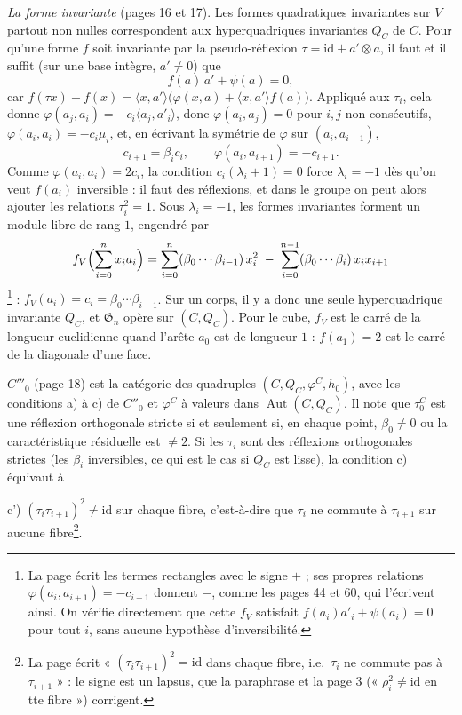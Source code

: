 \documentclass[11pt,a4paper]{article}
\begin{document}
\emph{La forme invariante} (pages 16 et 17). Les formes quadratiques invariantes
sur $V$ partout non nulles correspondent aux hyperquadriques invariantes $Q_C$
de $C$. Pour qu'une forme $f$ soit invariante par la pseudo-réflexion $\tau =
\mathrm{id} + a' \otimes a$, il faut et il suffit (sur une base intègre, $a'
\neq 0$) que
\[
f(a)\, a' + \psi(a) = 0 ,
\]
car $f(\tau x) - f(x) = \langle x, a' \rangle\bigl(\varphi(x, a) + \langle x, a'
\rangle f(a)\bigr)$. Appliqué aux $\tau_i$, cela donne $\varphi(a_j, a_i) =
-c_i \langle a_j, a'_i \rangle$, donc $\varphi(a_i, a_j) = 0$ pour $i, j$ non
consécutifs, $\varphi(a_i, a_i) = -c_i\mu_i$, et, en écrivant la symétrie de
$\varphi$ sur $(a_i, a_{i+1})$,
\[
c_{i+1} = \beta_i c_i , \qquad \varphi(a_i, a_{i+1}) = -c_{i+1}.
\]
Comme $\varphi(a_i, a_i) = 2c_i$, la condition $c_i(\lambda_i + 1) = 0$ force
$\lambda_i = -1$ dès qu'on veut $f(a_i)$ inversible : il faut des réflexions,
et dans le groupe on peut alors ajouter les relations $\tau_i^2 = 1$. Sous
$\lambda_i = -1$, les formes invariantes forment un module libre de rang $1$,
engendré par
\[
f_V\Bigl(\sum_{i=0}^n x_i a_i\Bigr) = \sum_{i=0}^{n} (\beta_0 \cdots
\beta_{i-1})\, x_i^2 \;-\; \sum_{i=0}^{n-1} (\beta_0 \cdots \beta_i)\, x_i x_{i+1}
\]
\footnote{La page écrit les termes rectangles avec le signe $+$ ; ses propres
relations $\varphi(a_i, a_{i+1}) = -c_{i+1}$ donnent $-$, comme les pages 44 et
60, qui l'écrivent ainsi. On vérifie directement que cette $f_V$ satisfait
$f(a_i)a'_i + \psi(a_i) = 0$ pour tout $i$, sans aucune hypothèse
d'inversibilité.} : $f_V(a_i) = c_i = \beta_0 \cdots \beta_{i-1}$. Sur un corps,
il y a donc une seule hyperquadrique invariante $Q_C$, et $\mathfrak{G}_n$
opère sur $(C, Q_C)$. Pour le cube, $f_V$ est le carré de la longueur
euclidienne quand l'arête $a_0$ est de longueur $1$ : $f(a_1) = 2$ est le carré
de la diagonale d'une face.

\emph{$C'''_0$} (page 18) est la catégorie des quadruples $(C, Q_C, \varphi^C,
h_0)$, avec les conditions a) à c) de $C''_0$ et $\varphi^C$ à valeurs dans
$\operatorname{Aut}(C, Q_C)$. Il note que $\tau_0^C$ est une réflexion
orthogonale stricte si et seulement si, en chaque point, $\beta_0 \neq 0$ ou la
caractéristique résiduelle est $\neq 2$. Si les $\tau_i$ sont des réflexions
orthogonales strictes (les $\beta_i$ inversibles, ce qui est le cas si $Q_C$
est lisse), la condition c) équivaut à

c') $(\tau_i\tau_{i+1})^2 \neq \mathrm{id}$ sur chaque fibre, c'est-à-dire
que $\tau_i$ ne commute à $\tau_{i+1}$ sur aucune fibre\footnote{La page écrit
« $(\tau_i\tau_{i+1})^2 = \mathrm{id}$ dans chaque fibre, i.e.\ $\tau_i$ ne
commute pas à $\tau_{i+1}$ » : le signe est un lapsus, que la paraphrase et la
page 3 (« $\rho_i^2 \neq \mathrm{id}$ en tte fibre ») corrigent.}.
\end{document}
